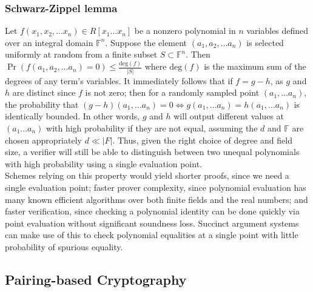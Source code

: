 \subsubsection{Schwarz-Zippel lemma}
\noindent Let $f(x_1, x_2, \dots x_n) \in R[x_1 \dots x_n]$ be a nonzero polynomial in $n$ variables defined over an integral domain $\mathbb{F}^{n}$. Suppose the element $(a_1, a_2, \dots a_n)$ is selected uniformly at random from a finite subset $S \subset \mathbb{F}^n$. Then 
$\Pr(f(a_1, a_2, \dots a_n) = 0) \le \frac{\text{deg}(f)}{|S|}$
where $\text{deg}(f)$ is the maximum sum of the degrees of any term's variables. It immediately follows that if $f = g-h$, as $g$ and $h$ are distinct since $f$ is not zero; then for a randomly sampled point $(a_1, \dots a_n)$, the probability that 
$(g-h)(a_1, \dots a_n) = 0 \Leftrightarrow g(a_1, \dots a_n) = h(a_1, \dots a_n)$
is identically bounded. In other words, $g$ and $h$ will output different values at $(a_1 \dots a_n)$ with high probability if they are not equal, assuming the $d$ and $\mathbb{F}$ are chosen appropriately $d \ll |F|$. Thus, given the right choice of degree and field size, a verifier will still be able to distinguish between two unequal polynomials with high probability using a single evaluation point.\\ 

\noindent Schemes relying on this property would yield shorter proofs, since we need a single evaluation point; faster prover complexity, since polynomial evaluation has many known efficient algorithms over both finite fields and the real numbers; and faster verification, since checking a polynomial identity can be done quickly via point evaluation without significant soundness loss. Succinct argument systems can make use of this to check polynomial equalities at a single point with little probability of spurious equality.

\subsection{Pairing-based Cryptography}

